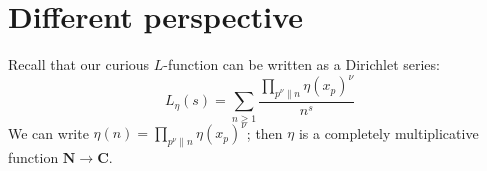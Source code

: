 \documentclass{article}
\newcommand{\bC}{\mathbf{C}}
\newcommand{\bN}{\mathbf{N}}
\theoremstyle{definition}
\begin{document}
\section{Different perspective}

Recall that our curious $L$-function can be written as a Dirichlet series:
\[
	L_\eta(s) = \sum_{n\geqslant 1} \frac{\prod_{p^\nu \| n} \eta(x_p)^\nu}{n^s}
\]
We can write $\eta(n) = \prod_{p^\nu\| n} \eta(x_p)^\nu$; then $\eta$ is a 
completely multiplicative function $\bN\to \bC$. 





\printbibliography
\end{document}
